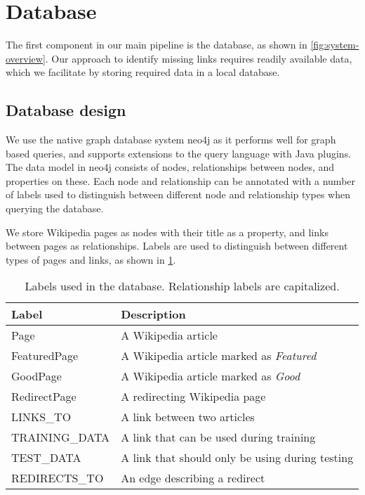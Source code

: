 \section{Database}\label{sec:db}
The first component in our main pipeline is the database, as shown in \cref{fig:system-overview}. Our approach to identify missing links requires readily available data, which we facilitate by storing required data in a local database.

\subsection{Database design}\label{sec:db_design}
We use the native graph database system neo4j as it performs well for graph based queries, and supports extensions to the query language with Java plugins. The data model in neo4j consists of nodes, relationships between nodes, and properties on these. Each node and relationship can be annotated with a number of labels used to distinguish between different node and relationship types when querying the database.

We store Wikipedia pages as nodes with their title as a property, and links between pages as relationships. Labels are used to distinguish between different types of pages and links, as shown in \cref{tab:db_labels}.

\begin{table}[tbp]
\centering
\begin{tabular}{@{}ll@{}}
\toprule
\textbf{Label}         & \textbf{Description}                            \\ \midrule
Page                   & A Wikipedia article                             \\
FeaturedPage           & A Wikipedia article marked as \emph{Featured}   \\
GoodPage               & A Wikipedia article marked as \emph{Good}       \\
RedirectPage           & A redirecting Wikipedia page                    \\ \midrule
LINKS\_TO              & A link between two articles                     \\
TRAINING\_DATA         & A link that can be used during training         \\
TEST\_DATA             & A link that should only be using during testing \\
REDIRECTS\_TO          & An edge describing a redirect                   \\ \bottomrule
\end{tabular}
\caption[Labels used in the database]{Labels used in the database. Relationship labels are capitalized.}%
\label{tab:db_labels}
\end{table}

